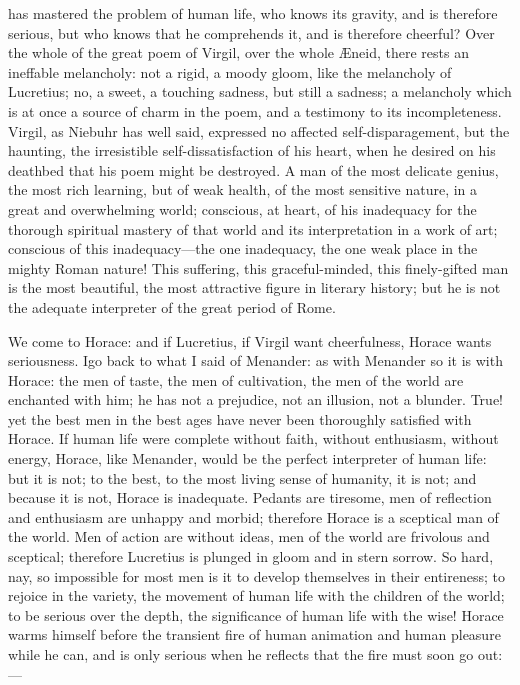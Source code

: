 has mastered the problem of human life, who knows its gravity, and is
therefore serious, but who knows that he comprehends it, and is
therefore cheerful? Over the whole of the great poem of Virgil, over the
whole Æneid, there rests an ineffable melancholy: not a rigid, a moody
gloom, like the melancholy of Lucretius; no, a sweet, a touching
sadness, but still a sadness; a melancholy which is at once a source of
charm in the poem, and a testimony to its incompleteness. Virgil, as
Niebuhr has well said, expressed no affected self-disparagement, but the
haunting, the irresistible self-dissatisfaction of his heart, when he
desired on his deathbed that his poem might be destroyed. A man of the
most delicate genius, the most rich learning, but of weak health, of the
most sensitive nature, in a great and overwhelming world; conscious, at
heart, of his inadequacy for the thorough spiritual mastery of that
world and its interpretation in a work of art; conscious of this
inadequacy---the one inadequacy, the one weak place in the mighty Roman
nature! This suffering, this graceful-minded, this finely-gifted man is
the most beautiful, the most attractive figure in literary history; but
he is not the adequate interpreter of the great period of Rome.

We come to Horace: and if Lucretius, if Virgil want cheerfulness, Horace
wants seriousness. Igo back to what I said of Menander: as with Menander
so it is with Horace: the men of taste, the men of cultivation, the men
of the world are enchanted with him; he has not a prejudice, not an
illusion, not a blunder. True! yet the best men in the best ages have
never been thoroughly satisfied with Horace. If human life were complete
without faith, without enthusiasm, without energy, Horace, like
Menander, would be the perfect interpreter of human life: but it is not;
to the best, to the most living sense of humanity, it is not; and
because it is not, Horace is inadequate. Pedants are tiresome, men of
reflection and enthusiasm are unhappy and morbid; therefore Horace is a
sceptical man of the world. Men of action are without ideas, men of the
world are frivolous and sceptical; therefore Lucretius is plunged in
gloom and in stern sorrow. So hard, nay, so impossible for most men is
it to develop themselves in their entireness; to rejoice in the variety,
the movement of human life with the children of the world; to be serious
over the depth, the significance of human life with the wise! Horace
warms himself before the transient fire of human animation and human
pleasure while he can, and is only serious when he reflects that the
fire must soon go out:---


